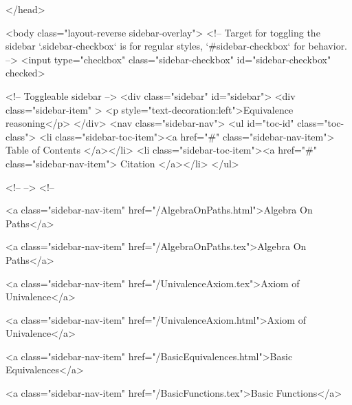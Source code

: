   
</head>




  <body class="layout-reverse sidebar-overlay">
    <!-- Target for toggling the sidebar `.sidebar-checkbox` is for regular
     styles, `#sidebar-checkbox` for behavior. -->
<input type="checkbox" class="sidebar-checkbox" id="sidebar-checkbox" checked>

<!-- Toggleable sidebar -->
<div class="sidebar" id="sidebar">
  <div class="sidebar-item" >
    <p style="text-decoration:left">Equivalence reasoning</p>
  </div>
  <nav class="sidebar-nav">
    <ul id="toc-id" class="toc-class">
  <li class="sidebar-toc-item"><a href="#" class="sidebar-nav-item"> Table of Contents </a></li>
  <li class="sidebar-toc-item"><a href="#" class="sidebar-nav-item"> Citation </a></li>
</ul>


    <!--  -->
    <!-- 
      
    
      
    
      
    
      
    
      
        
      
    
      
        
          <a class="sidebar-nav-item" href="/AlgebraOnPaths.html">Algebra On Paths</a>
        
      
    
      
        
          <a class="sidebar-nav-item" href="/AlgebraOnPaths.tex">Algebra On Paths</a>
        
      
    
      
        
          <a class="sidebar-nav-item" href="/UnivalenceAxiom.tex">Axiom of Univalence</a>
        
      
    
      
        
          <a class="sidebar-nav-item" href="/UnivalenceAxiom.html">Axiom of Univalence</a>
        
      
    
      
        
          <a class="sidebar-nav-item" href="/BasicEquivalences.html">Basic Equivalences</a>
        
      
    
      
        
          <a class="sidebar-nav-item" href="/BasicFunctions.tex">Basic Functions</a>
        
